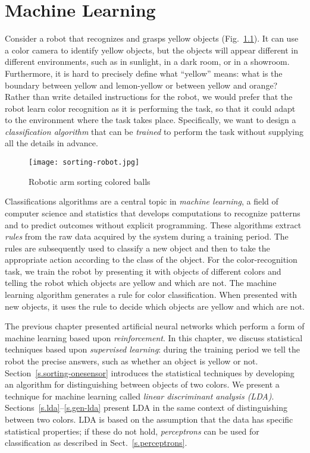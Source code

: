 
\chapter{Machine Learning}\label{ch.machine}

Consider a robot that recognizes and grasps yellow objects (Fig.~\ref{fig.sortballs}). It can use a color camera to identify yellow objects, but the objects will appear different in different environments, such as in sunlight, in a dark room, or in a showroom. Furthermore, it is hard to precisely define what ``yellow'' means: what is the boundary between yellow and lemon-yellow or between yellow and orange? Rather than write detailed instructions for the robot, we would prefer that the robot learn color recognition as it is performing the task, so that it  could adapt to the environment where the task takes place. Specifically, we want to design a \emph{classification algorithm} that can be \emph{trained} to perform the task without supplying all the details in advance.

\begin{figure}
\begin{center}
\texttt{[image: sorting-robot.jpg]}
\end{center}
\caption{Robotic arm sorting colored balls}\label{fig.sortballs}
\end{figure}

Classifications algorithms are a central topic in \emph{machine learning}, a field of computer science and statistics that develops computations to recognize patterns and to predict outcomes without explicit programming. These algorithms extract \emph{rules} from the raw data acquired by the system during a training period. The rules are subsequently used to classify a new object and then to take the appropriate action according to the class of the object. For the color-recognition task, we train the robot by presenting it with objects of different colors and telling the robot which objects are yellow and which are not. The machine learning algorithm generates a rule for color classification. When presented with new objects, it uses the rule to decide which objects are yellow and which are not.

The previous chapter presented artificial neural networks which perform a form of machine learning based upon \emph{reinforcement}. In this chapter, we discuss statistical techniques based upon \emph{supervised learning}: during the training period we tell the robot the precise answers, such as whether an object is yellow or not. Section~\ref{s.sorting-onesensor} introduces the statistical techniques by developing an algorithm for distinguishing between objects of two colors. We present a technique for machine learning called \emph{linear discriminant analysis (LDA)}. Sections~\ref{s.lda}--\ref{s.gen-lda} present LDA in the same context of distinguishing between two colors. LDA is based on the assumption that the data has specific statistical properties; if these do not hold, \emph{perceptrons} can be used for classification as described in Sect.~\ref{s.perceptrons}.

